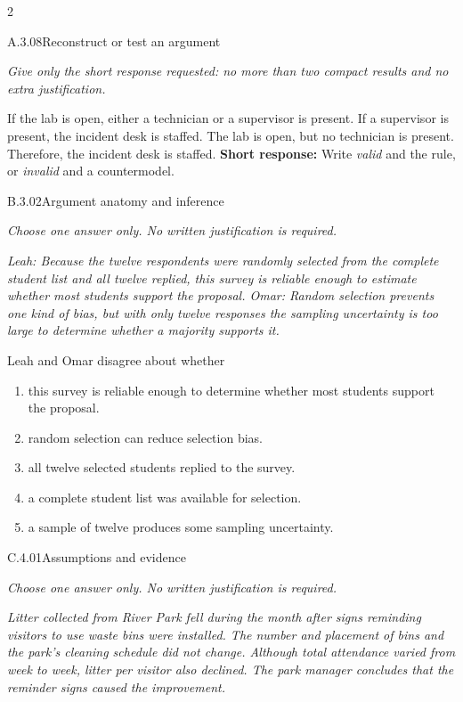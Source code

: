 \documentclass[9pt]{extarticle}
\newcommand{\choice}[1]{\item #1}
\begin{document}
\begin{multicols}{2}
\begin{DenseCoreProblem}{A.3.08}{Reconstruct or test an argument}
{\scriptsize\textit{Give only the short response requested: no more than two compact results and no extra justification.}\par}
If the lab is open, either a technician or a supervisor is present. If a supervisor is present, the incident desk is staffed. The lab is open, but no technician is present. Therefore, the incident desk is staffed.
\textbf{Short response:} Write \emph{valid} and the rule, or \emph{invalid} and a countermodel.
\end{DenseCoreProblem}
\begin{DenseCoreProblem}{B.3.02}{Argument anatomy and inference}
{\scriptsize\textit{Choose one answer only. No written justification is required.}\par}
\emph{Leah: Because the twelve respondents were randomly selected from the complete student list and all twelve replied, this survey is reliable enough to estimate whether most students support the proposal. Omar: Random selection prevents one kind of bias, but with only twelve responses the sampling uncertainty is too large to determine whether a majority supports it.}

Leah and Omar disagree about whether
\begin{enumerate}[label=(\alph*)]
  \choice{this survey is reliable enough to determine whether most students support the proposal.}
  \choice{random selection can reduce selection bias.}
  \choice{all twelve selected students replied to the survey.}
  \choice{a complete student list was available for selection.}
  \choice{a sample of twelve produces some sampling uncertainty.}
\end{enumerate}
\end{DenseCoreProblem}
\columnbreak
\begin{DenseCoreProblem}{C.4.01}{Assumptions and evidence}
{\scriptsize\textit{Choose one answer only. No written justification is required.}\par}
\emph{Litter collected from River Park fell during the month after signs reminding visitors to use waste bins were installed. The number and placement of bins and the park's cleaning schedule did not change. Although total attendance varied from week to week, litter per visitor also declined. The park manager concludes that the reminder signs caused the improvement.}


\end{DenseCoreProblem}
\end{multicols}
\end{document}
